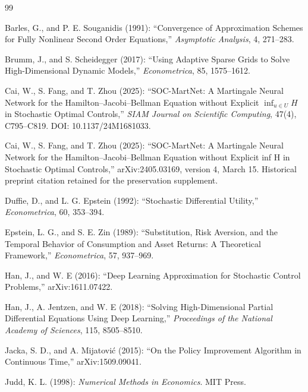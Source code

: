 \begin{thebibliography}{99}

 Barles, G., and P. E. Souganidis (1991): ``Convergence of Approximation Schemes for Fully Nonlinear Second Order Equations,'' \emph{Asymptotic Analysis}, 4, 271--283.

 Brumm, J., and S. Scheidegger (2017): ``Using Adaptive Sparse Grids to Solve High-Dimensional Dynamic Models,'' \emph{Econometrica}, 85, 1575--1612.

 Cai, W., S. Fang, and T. Zhou (2025): ``SOC-MartNet: A Martingale Neural Network for the Hamilton--Jacobi--Bellman Equation without Explicit $\inf_{u\in U}H$ in Stochastic Optimal Controls,'' \emph{SIAM Journal on Scientific Computing}, 47(4), C795--C819. DOI: 10.1137/24M1681033.

 Cai, W., S. Fang, and T. Zhou (2025): ``SOC-MartNet: A Martingale Neural Network for the Hamilton--Jacobi--Bellman Equation without Explicit inf H in Stochastic Optimal Controls,'' arXiv:2405.03169, version 4, March 15. Historical preprint citation retained for the preservation supplement.

 Duffie, D., and L. G. Epstein (1992): ``Stochastic Differential Utility,'' \emph{Econometrica}, 60, 353--394.

 Epstein, L. G., and S. E. Zin (1989): ``Substitution, Risk Aversion, and the Temporal Behavior of Consumption and Asset Returns: A Theoretical Framework,'' \emph{Econometrica}, 57, 937--969.

 Han, J., and W. E (2016): ``Deep Learning Approximation for Stochastic Control Problems,'' arXiv:1611.07422.

 Han, J., A. Jentzen, and W. E (2018): ``Solving High-Dimensional Partial Differential Equations Using Deep Learning,'' \emph{Proceedings of the National Academy of Sciences}, 115, 8505--8510.

 Jacka, S. D., and A. Mijatovi\'c (2015): ``On the Policy Improvement Algorithm in Continuous Time,'' arXiv:1509.09041.

 Judd, K. L. (1998): \emph{Numerical Methods in Economics}. MIT Press.


\end{thebibliography}
